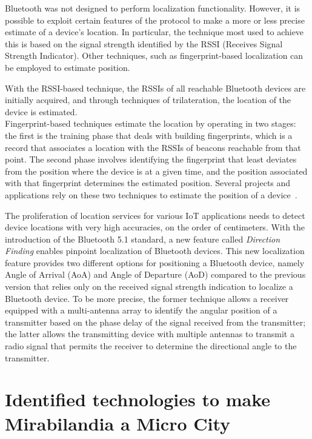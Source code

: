 Bluetooth was not designed to perform localization functionality. However, it is possible to exploit certain features of the protocol to make a more
or less precise estimate of a device's location. In particular, the technique most used to achieve this is based on the signal strength identified by
the RSSI (Receives Signal Strength Indicator). Other techniques, such as fingerprint-based localization can be employed to estimate position.

With the RSSI-based technique, the RSSIs of all reachable Bluetooth devices are initially acquired, and through techniques of trilateration, the
location of the device is estimated.\\ Fingerprint-based techniques estimate the location by operating in two stages: the first is the training phase
that deals with building fingerprints, which is a record that associates a location with the RSSIs of beacons reachable from that point. The second
phase involves identifying the fingerprint that least deviates from the position where the device is at a given time, and the position associated
with that fingerprint determines the estimated position. Several projects and applications rely on these two techniques to estimate the position of a
device~\cite{mcconville2021vesta, samuel2021smart}.

The proliferation of location services for various IoT applications needs to detect device locations with very high accuracies, on the order of
centimeters. With the introduction of the Bluetooth 5.1 standard, a new feature called \textit{Direction Finding} enables pinpoint localization of
Bluetooth devices. This new localization feature provides two different options for positioning a Bluetooth device, namely Angle of Arrival (AoA) and
Angle of Departure (AoD) compared to the previous version that relies only on the received signal strength indication to localize a Bluetooth device.
To be more precise, the former technique allows a receiver equipped with a multi-antenna array to identify the angular position of a transmitter
based on the phase delay of the signal received from the transmitter; the latter allows the transmitting device with multiple antennas to transmit a
radio signal that permits the receiver to determine the directional angle to the transmitter.

\section{Identified technologies to make Mirabilandia a Micro City}

